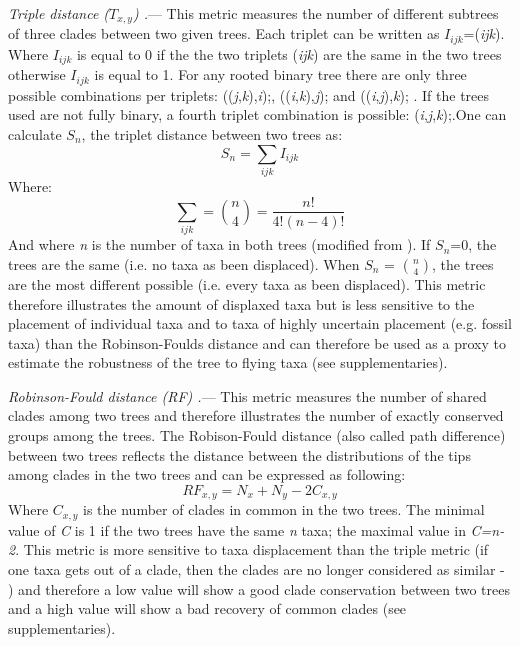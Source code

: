 \documentclass[12pt,letterpaper]{article}
\renewcommand{\subsubsection}[1]{%
\vspace{2ex}
\noindent
\textit{#1.}---}
\begin{document}
\subsubsection{Triple distance ($T_{x,y}$) \citep{dobson1975triplets}}
This metric measures the number of different subtrees of three clades between two given trees. Each triplet can be written as $I_{ijk}$=(\textit{ijk}). Where $I_{ijk}$ is equal to 0 if the the two triplets (\textit{ijk}) are the same in the two trees otherwise $I_{ijk}$ is equal to 1. For any rooted binary tree there are only three possible combinations per triplets: ((\textit{j},\textit{k}),\textit{i});, ((\textit{i},\textit{k}),\textit{j}); and ((\textit{i},\textit{j}),\textit{k}); \citep{johnson1998}. If the trees used are not fully binary, a fourth triplet combination is possible: (\textit{i},\textit{j},\textit{k});.One can calculate $S_n$, the triplet distance between two trees as:
\begin{equation}
S_n = \sum_{ijk} I_{ijk}
\end{equation}
Where:
\begin{equation}
\sum_{ijk} = \binom{n}{4} = \frac{n!}{4!(n-4)!}
\end{equation}
And where \textit{n} is the number of taxa in both trees (modified from \citet{critchlowthe1996}). If $S_n$=0, the trees are the same (i.e. no taxa as been displaced). When $S_n$ = $\binom{n}{4}$, the trees are the most different possible (i.e. every taxa as been displaced). This metric therefore illustrates the amount of displaxed taxa but is less sensitive to the placement of individual taxa and to taxa of highly uncertain placement (e.g. fossil taxa) than the Robinson-Foulds distance \citep{critchlowthe1996,johnson1998,wiensmissing2003} and can therefore be used as a proxy to estimate the robustness of the tree to flying taxa (see supplementaries). %

\subsubsection{Robinson-Fould distance (\textit{RF}) \citep{RF1981}}
This metric measures the number of shared clades among two trees and therefore illustrates the number of exactly conserved groups among the trees. The Robison-Fould distance (also called path difference) between two trees reflects the distance between the distributions of the tips among clades in the two trees \citep{RF1981} and can be expressed as following:
\begin{equation}
RF_{x,y} = N_{x} + N_{y} - 2C_{x,y}
\end{equation}
Where $C_{x,y}$ is the number of clades in common in the two trees. The minimal value of \textit{C} is 1 if the two trees have the same \textit{n} taxa; the maximal value in \textit{C=n-2}. This metric is more sensitive to taxa displacement than the triple metric (if one taxa gets out of a clade, then the clades are no longer considered as similar - \citet{critchlowthe1996,johnson1998,wiensmissing2003}) and therefore a low value will show a good clade conservation between two trees and a high value will show a bad recovery of common clades (see supplementaries). %
\end{document}
